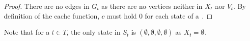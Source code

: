 \subsubsection*{\LeafNode{}}

%
\begin{proof}
	There are no edges in \( G_t \) as there are no vertices
	neither in \( X_t \) nor \( V_t \).
	By definition of the cache function,
	\( c \) must hold \( 0 \) for each state of a \LeafNode{}.
\end{proof}
%
Note that for a \LeafNode{} \( t \in T \),
the only state in \( S_t \) is \( (\emptyset, \emptyset, \emptyset, \emptyset) \)
as \( X_t = \emptyset \).

\subsubsection*{\IntroduceVertexNode{}}

